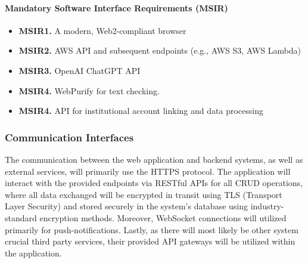 \paragraph{Mandatory Software Interface Requirements (MSIR)}
\begin{itemize}
    \item \textbf{MSIR1.} A modern, Web2-compliant browser
    \item \textbf{MSIR2.} AWS API and subsequent endpoints (e.g., AWS S3, AWS Lambda)
    \item \textbf{MSIR3.} OpenAI ChatGPT API
    \item \textbf{MSIR4.} WebPurify for text checking.
    \item \textbf{MSIR4.} API for institutional account linking and data processing

\end{itemize}




\subsubsection{Communication Interfaces}
The communication between the web application and backend systems, as well as external services, will primarily use the HTTPS protocol. The application will interact with the provided endpoints via RESTful APIs for all CRUD operations, where all data exchanged will be encrypted in transit using TLS (Transport Layer Security) and stored securely in the system's database using industry-standard encryption methods. Moreover, WebSocket connections will utilized primarily for push-notifications. Lastly, as there will most likely be other system crucial third party services, their provided API gateways will be utilized within the application.
